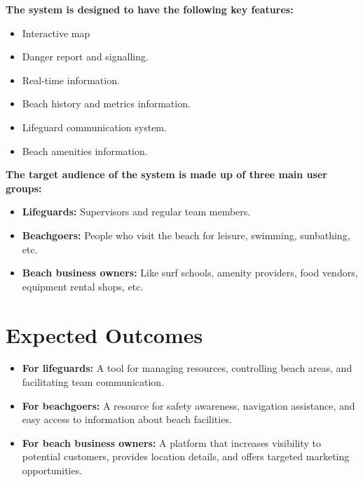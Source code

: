 \vspace{1em}
\textbf{The system is designed to have the following key features:}
\\
    \begin{itemize}
        \item Interactive map
        \item Danger report and signalling.
        \item Real-time information.
        \item Beach history and metrics information.
        \item Lifeguard communication system.
        \item Beach amenities information.     
    \end{itemize}
    
\vspace{1em}
\textbf{The target audience of the system is made up of three main user groups:}
\\
    \begin{itemize}
        \item \textbf{Lifeguards:} Supervisors and regular team members.
        \item \textbf{Beachgoers:} People who visit the beach for leisure, swimming, sunbathing, etc.
        \item \textbf{Beach business owners:} Like surf schools, amenity providers, food vendors, equipment rental shops, etc.
    \end{itemize}
    
\section{Expected Outcomes}
\label{section:expected_outcomes}

    \begin{itemize}
        \item \textbf{For lifeguards:} A tool for managing resources, controlling beach areas, and facilitating team communication.
        \item \textbf{For beachgoers:} A resource for safety awareness, navigation assistance, and easy access to information about beach facilities.
        \item \textbf{For beach business owners:} A platform that increases visibility to potential customers, provides location details, and offers targeted marketing opportunities.
    \end{itemize}